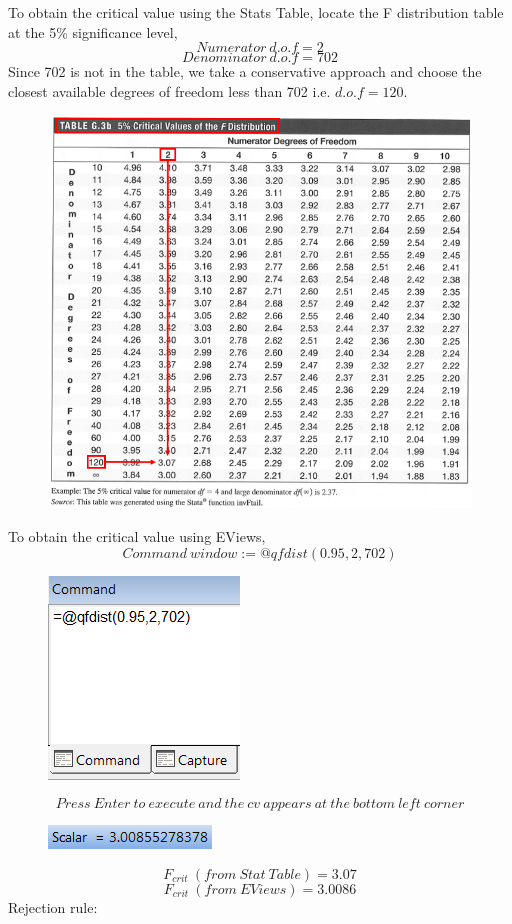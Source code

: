 \documentclass[12pt]{report}
\begin{document}
\noindent To obtain the critical value using the Stats Table, locate the F distribution table at the 5\% significance level,
$$Numerator\ d.o.f = 2$$
$$Denominator\ d.o.f = 702$$
\noindent Since 702 is not in the table, we take a conservative approach and choose the closest available degrees of freedom less than 702 i.e. $d.o.f=120$. 
\begin{figure}[H]
	\centerline{\includegraphics{tute6_q2_7}}
\end{figure}
\vspace{-\baselineskip}
\noindent To obtain the critical value using EViews,
$$Command\ window:=@qfdist(0.95,2,702)$$
\begin{figure}[H]
	\centerline{\includegraphics{tute6_q2_8}}
\end{figure}
\vspace{-\baselineskip} $$Press\ Enter\ to\ execute\ and\ the\ cv\ appears\ at\ the\ bottom\ left\ corner$$ \begin{figure}[H]
	\centerline{\includegraphics{tute6_q2_9}}
\end{figure}
\vspace{-\baselineskip}
$$F_{crit}\ (from\ Stat\ Table) = 3.07$$
$$F_{crit}\ (from\ EViews) = 3.0086$$ \noindent Rejection rule: 
\end{document}
